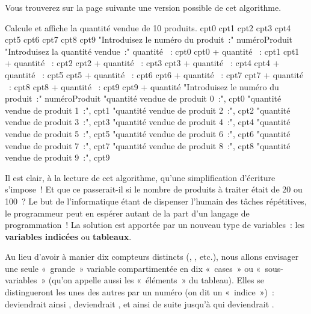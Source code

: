 		Vous trouverez sur la page suivante
		une version possible de cet algorithme.
	
		\begin{LDA}
		\LComment Calcule et affiche la quantité vendue de 10 produits.
			\Empty
			\Empty
			\Let cpt0 
			\Let cpt1 
			\Let cpt2 
			\Let cpt3 
			\Let cpt4 
			\Let cpt5 
			\Let cpt6 
			\Let cpt7 
			\Let cpt8 
			\Let cpt9 
			\Empty
			\Write "Introduisez le numéro du produit~:"
			\Read numéroProduit
			\Empty
			\Empty
				\Write "Introduisez la quantité vendue~:"
				\Read quantité
				\Empty
					~: cpt0 \Gets cpt0 + quantité
					~: cpt1 \Gets cpt1 + quantité
					~: cpt2 \Gets cpt2 + quantité
					~: cpt3 \Gets cpt3 + quantité
					~: cpt4 \Gets cpt4 + quantité
					~: cpt5 \Gets cpt5 + quantité
					~: cpt6 \Gets cpt6 + quantité
					~: cpt7 \Gets cpt7 + quantité
					~: cpt8 \Gets cpt8 + quantité
					~: cpt9 \Gets cpt9 + quantité
				\EndSwitch
				\Empty
				\Write "Introduisez le numéro du produit~:"
				\Read numéroProduit
				\Empty
			\EndWhile
			\Empty
			\Write "quantité vendue de produit 0~:", cpt0
			\Write "quantité vendue de produit 1~:", cpt1
			\Write "quantité vendue de produit 2~:", cpt2
			\Write "quantité vendue de produit 3~:", cpt3
			\Write "quantité vendue de produit 4~:", cpt4
			\Write "quantité vendue de produit 5~:", cpt5
			\Write "quantité vendue de produit 6~:", cpt6
			\Write "quantité vendue de produit 7~:", cpt7
			\Write "quantité vendue de produit 8~:", cpt8
			\Write "quantité vendue de produit 9~:", cpt9
			\Empty
		\EndAlgo
		\end{LDA}
	
		Il est clair, à la lecture de cet algorithme, 
		qu’une simplification d’écriture s’impose~! 
		Et que ce passerait-il si le nombre de produits à
		traiter était de 20 ou 100~? 
		Le but de l’informatique étant de dispenser l’humain 
		des tâches répétitives, 
		le programmeur peut en espérer autant 
		de la part d’un langage de programmation~!
		La solution est apportée par un nouveau type de variables~: 
		les \textbf{variables indicées} ou \textbf{tableaux}.
	
		Au lieu d’avoir à manier dix compteurs distincts
		(, , etc.), 
		nous allons envisager une seule «~grande~» variable 
		 compartimentée en dix «~cases~» ou «~sous-variables~»
		(qu’on appelle aussi les «~éléments~» du tableau). 
		Elles se distingueront les unes des autres par un numéro 
		(on dit un «~indice~»)~: 
		 deviendrait ainsi , 
		 deviendrait , 
		et ainsi de suite jusqu’à
		 qui deviendrait .
	
